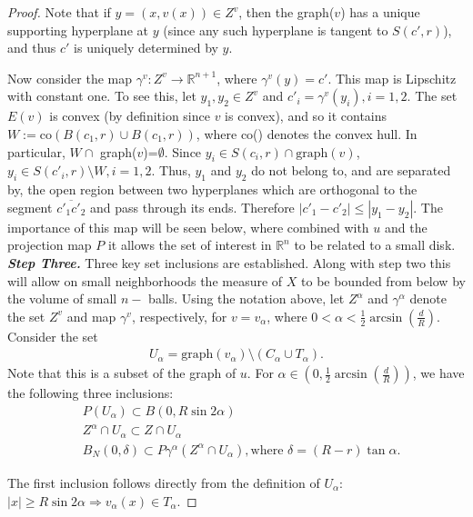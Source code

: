 \documentclass[10pt]{article}
\begin{document}
\begin{proof}
Note that if $y=(x,v(x))\in Z^{v}$, then the graph($v$) has a unique supporting hyperplane at $y$ (since any such hyperplane is tangent to $S(c',r)$), and thus $c'$ is uniquely determined by $y$.

Now consider the map $\gamma^{v}:Z^{v}\rightarrow \mathbb{R}^{n+1}$, where $\gamma^{v}(y)=c'$. This map is Lipschitz with constant one. To see this, let $y_{1},y_{2}\in Z^{v}$ and $c'_{i}=\gamma^{v}(y_{i}), i=1,2.$ The set $E(v)$ is convex (by definition since $v$ is convex), and so it contains $W := \text{co}(B(c_{1},r)\cup B(c_{1},r))$, where co() denotes the convex hull. In particular, $W\cap$ graph($v$)=$\emptyset$. Since $y_{i}\in S(c_{i},r)\cap \text{graph}(v)$, $y_{i}\in S(c'_{i},r)\setminus W, i=1,2$. Thus, $y_{1}$ and $y_{2}$ do not belong to, and are separated by, the open region between two hyperplanes which are orthogonal to the segment $\overline{c'_{1}c'_{2}}$ and pass through its ends. Therefore $|c'_{1}-c'_{2}|\leq |y_{1}-y_{2}|$. The importance of this map will be seen below, where combined with $u$ and the projection map $P$ it allows the set of interest in $\mathbb{R}^n$ to be related to a small disk.\\
\textbf{\textit{Step Three.}} Three key set inclusions are established. Along with step two this will allow on small neighborhoods the measure of $X$ to be bounded from below by the volume of small $n-$ balls. Using the notation above, let $Z^{\alpha}$ and $\gamma^{\alpha}$ denote the set $Z^{v}$ and map $\gamma^{v}$, respectively, for $v=v_{\alpha}$, where $0<\alpha<\frac{1}{2}\arcsin (\frac{d}{R})$.\\
Consider the set 
\begin{align}
U_{\alpha}=\text{graph}(v_{\alpha})\setminus (C_{\alpha}\cup T_{\alpha}).
\end{align}
Note that this is a subset of the graph of $u$.
For $\alpha \in (0,\frac{1}{2}\arcsin(\frac{d}{R}))$, we have the following three inclusions:
\begin{align}
&P(U_{\alpha})\subset B(0,R\sin 2\alpha)\\
&Z^{\alpha}\cap U_{\alpha} \subset Z \cap U_{\alpha}\\
&B_{N}(0,\delta)\subset P\gamma^{\alpha}(Z^{\alpha}\cap U_{\alpha}), \text{where }\delta=(R-r)\tan \alpha.
\end{align}

The first inclusion follows directly from the definition of $U_{\alpha}$: $|x| \geq R \sin 2\alpha \Rightarrow v_{\alpha}(x)\in T_{\alpha}$.


\end{proof}
\end{document}
